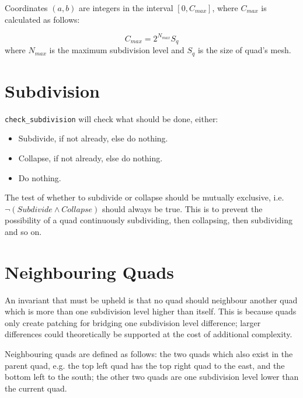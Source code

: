 \documentclass[a4paper]{article}
\begin{document}
  Coordinates $(a, b)$ are integers in the interval $[0,
    C_{max}]$, where $C_{max}$ is calculated as follows:

  \begin{equation}
    C_{max} = 2^{N_{max}} S_q
  \end{equation}
  where $N_{max}$ is the maximum subdivision level and $S_q$ is the size of quad's mesh. 

  \section*{Subdivision}
  \texttt{check\_subdivision} will check what should be done, either:
  \begin{itemize}
    \item Subdivide, if not already, else do nothing.
    \item Collapse, if not already, else do nothing.
    \item Do nothing.
  \end{itemize}
  The test of whether to subdivide or collapse should be mutually exclusive,
  i.e. $ \neg \left(\mathit{Subdivide} \land \mathit{Collapse}\right) $ should
  always be true. This is to prevent the possibility of a quad continuously
  subdividing, then collapsing, then subdividing and so on.

  \section*{Neighbouring Quads}
  An invariant that must be upheld is that no quad should neighbour another quad
  which is more than one subdivision level higher than itself. This is because
  quads only create patching for bridging one subdivision level difference;
  larger differences could theoretically be supported at the cost of additional
  complexity.

  Neighbouring quads are defined as follows: the two quads which also exist in
  the parent quad, e.g. the top left quad has the top right quad to the east,
  and the bottom left to the south; the other two quads are one subdivision
  level lower than the current quad.
\end{document}

